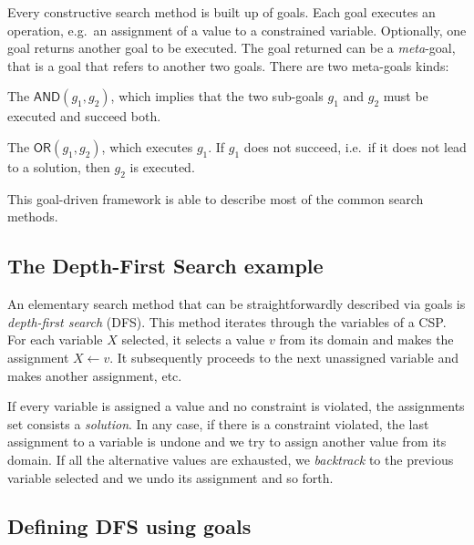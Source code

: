 \documentclass{ws-ijait}
\begin{document}
Every constructive search method is built up of goals. Each
goal executes an operation, e.g.\ an assignment of a value
to a constrained variable. Optionally, one goal returns
another goal to be executed. The goal returned can be a
\emph{meta}-goal, that is a goal that refers to another two
goals. There are two meta-goals kinds:
\begin{romanlist}
  \item The $\mathsf{AND}(g_1,g_2)$, which implies that the
        two sub-goals $g_1$ and $g_2$ must be executed and
        succeed both.
  \item The $\mathsf{OR}(g_1,g_2)$, which executes $g_1$. If
        $g_1$ does not succeed, i.e.\ if it does not lead to
        a solution, then $g_2$ is executed.
\end{romanlist}
This goal-driven framework is able to describe most of the
common search methods.

\subsection{The Depth-First Search example}

An elementary search method that can be straightforwardly
described via goals is \emph{depth-first search} (DFS). This
method iterates through the variables of a CSP\@. For each
variable $X$ selected, it selects a value $v$ from its
domain and makes the assignment $X \gets v$. It subsequently
proceeds to the next unassigned variable and makes another
assignment, etc.

If every variable is assigned a value and no constraint is
violated, the assignments set consists a \emph{solution}. In
any case, if there is a constraint violated, the last
assignment to a variable is undone and we try to assign
another value from its domain. If all the alternative values
are exhausted, we \emph{backtrack} to the previous variable
selected and we undo its assignment and so forth.

\subsection{Defining DFS using goals\label{DFS-goals}}
\end{document}
